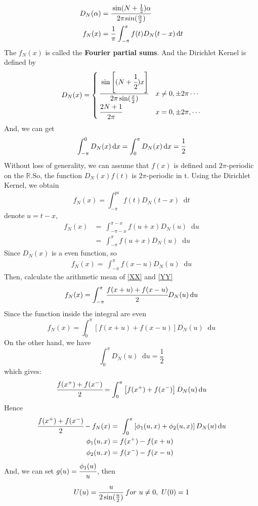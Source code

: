 \documentclass[margin,line]{res}
\newcommand*{\dif}{\mathop{}\!\mathrm{d}}
\begin{document}
\begin{resume}
\begin{itemize}
\begin{align}
	D_N(\alpha) &= \cfrac{\sin(N+\frac{1}{2})\alpha}{2\pi sin(\frac{\alpha}{2})} \nonumber \\
	f_N(x) &=\frac{1}{\pi}\int_{-\pi}^{\pi}{f(t)D_N(t-x)} \dif t \nonumber
\end{align}
The $f_N(x)$ is called the \textbf{Fourier partial sums}. And the Dirichlet Kernel is defined by
\begin{align}
	D_N(x) = 
	\begin{cases}
		\cfrac{ \sin\left[ (N+\cfrac{1}{2})x \right] }{2\pi \sin(\frac{x}{2})} & x \neq 0,\pm 2\pi \cdots \\
		\cfrac{2N+1}{2\pi} & x=0,\pm 2\pi, \cdots
	\end{cases} \nonumber
\end{align}
And, we can get 
$$
\int_{-\pi}^{0} D_N(x) \dif x = 
\int_{0}^{\pi} D_N(x) \dif x =
\cfrac{1}{2}
$$
Without loss of generality, we can assume that $f(x)$ is defined and $2\pi$-periodic on the $\mathbb{R}$.So, the function $D_N(x)f(t)$ is $2\pi$-periodic in t.
Using the Dirichlet Kernel, we obtain
$$
f_N(x) = \int_{-\pi}^{pi} f(t) D_N(t-x) \dif t
$$
denote $u=t-x$,
\begin{align}
f_N(x) 	&= \ \int_{-\pi -x}^{\pi -x} f(u+x) D_N(u) \dif u \nonumber \\
	 	&= \ \int_{-\pi}^{\pi} f(u+x) D_N(u) \dif u \label{XX}
\end{align}
Since $D_N(x)$ is a even function, so
\begin{align}
f_N(x) = \ \int_{-\pi}^{\pi} f(x-u) D_N(u) \dif u \label{YY}
\end{align}
Then, calculate the arithmetic mean of \eqref{XX} and \eqref{YY}
$$
f_N(x)=\int_{-\pi}^{\pi}\cfrac{f(x+u)+f(x-u)}{2}D_N(u) \dif u
$$
Since the function inside the integral are even
$$
f_N(x)=\int_{0}^{\pi}\left[ f(x+u)+f(x-u) \right]D_N(u) \dif u
$$
On the other hand, we have
$$
\int_{0}^{\pi}D_N(u) \dif u = \frac{1}{2}
$$
which gives:
$$
\cfrac{f(x^{+})+f(x^{-})}{2} = \int_{0}^{\pi} \left[ f(x^{+})+f(x^{-}) \right]D_N(u) \dif u
$$
Hence
\begin{align}
	\cfrac{f(x^{+})+f(x^{-})}{2} - f_N(x) &=
	\ \int_{0}^{\pi} \left[ \phi_{1}(u,x)+\phi_{2}(u,x) \right] D_N(u) \dif u \nonumber \\
	\phi_{1}(u,x)&=f(x^{+})-f(x+u) \nonumber \\
	\phi_{2}(u,x)&=f(x^{-})-f(x-u) \nonumber
\end{align}
And, we can set $g(u)=\cfrac{\phi_{1}(u)}{u}$, then
$$
U(u)=\cfrac{u}{2 \sin( \frac{u}{2} ) } \ for \ u \neq 0, \ U(0)=1
$$
\end{itemize}
\end{resume}
\end{document}
